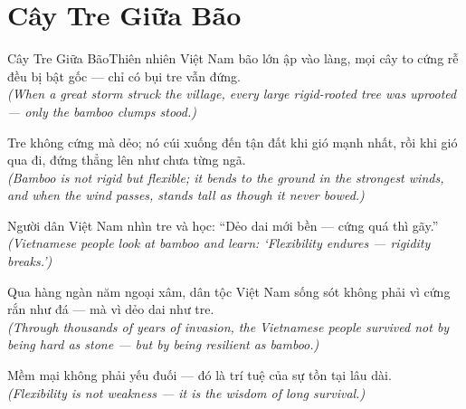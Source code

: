 \section{Cây Tre Giữa Bão}
\begin{truyen}{Cây Tre Giữa Bão}{Thiên nhiên Việt Nam}
 bão lớn ập vào làng, mọi cây to cứng rễ đều bị bật gốc --- chỉ có bụi tre vẫn đứng.\\[4pt]
\textit{(When a great storm struck the village, every large rigid-rooted tree was uprooted --- only the bamboo clumps stood.)}

Tre không cứng mà dẻo; nó cúi xuống đến tận đất khi gió mạnh nhất, rồi khi gió qua đi, đứng thẳng lên như chưa từng ngã.\\[4pt]
\textit{(Bamboo is not rigid but flexible; it bends to the ground in the strongest winds, and when the wind passes, stands tall as though it never bowed.)}

Người dân Việt Nam nhìn tre và học: ``Dẻo dai mới bền --- cứng quá thì gãy.''\\[4pt]
\textit{(Vietnamese people look at bamboo and learn: `Flexibility endures --- rigidity breaks.')}

Qua hàng ngàn năm ngoại xâm, dân tộc Việt Nam sống sót không phải vì cứng rắn như đá --- mà vì dẻo dai như tre.\\[4pt]
\textit{(Through thousands of years of invasion, the Vietnamese people survived not by being hard as stone --- but by being resilient as bamboo.)}

\end{truyen}
\begin{baihoc}
  Mềm mại không phải yếu đuối --- đó là trí tuệ của sự tồn tại lâu dài.\\[4pt]
  \textit{(Flexibility is not weakness --- it is the wisdom of long survival.)}
\end{baihoc}

